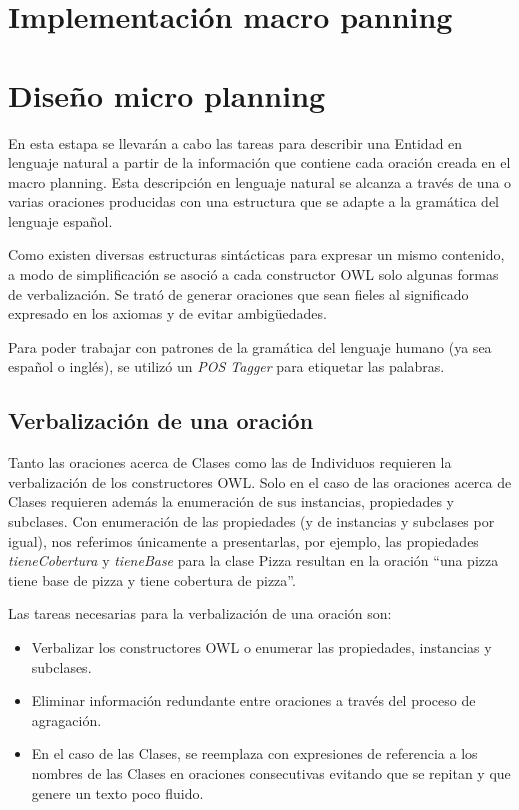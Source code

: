 \section{Implementación macro panning}

\section{Diseño micro planning}
En esta estapa se llevarán a cabo las tareas para describir una Entidad en lenguaje natural a partir de la información que contiene cada oración creada en el macro planning. Esta descripción en lenguaje natural se alcanza a través de una o varias oraciones producidas con una estructura que se adapte a la gramática del lenguaje español.

Como existen diversas estructuras sintácticas para expresar un mismo contenido, a modo de simplificación se asoció a cada constructor OWL solo algunas formas de verbalización. Se trató de generar oraciones que sean fieles al significado expresado en los axiomas y de evitar ambigüedades.

Para poder trabajar con patrones de la gramática del lenguaje humano (ya sea español o inglés), se utilizó un \emph{POS Tagger} para etiquetar las palabras.

\subsection{Verbalización de una oración}
Tanto las oraciones acerca de Clases como las de Individuos requieren la verbalización de los constructores OWL. Solo en el caso de las oraciones acerca de Clases requieren además la enumeración de sus instancias, propiedades y subclases. Con enumeración de las propiedades (y de instancias y subclases por igual), nos referimos únicamente a presentarlas, por ejemplo, las propiedades \emph{tieneCobertura} y \emph{tieneBase} para la clase Pizza resultan en la oración ``una pizza tiene base de pizza y tiene cobertura de pizza''.

Las tareas necesarias para la verbalización de una oración son:
\begin{itemize}
    \item Verbalizar los constructores OWL o enumerar las propiedades, instancias y subclases.
    \item Eliminar información redundante entre oraciones a través del proceso de agragación.
    \item En el caso de las Clases, se reemplaza con expresiones de referencia a los nombres de las Clases en oraciones consecutivas evitando que se repitan y que genere un texto poco fluido.
\end{itemize}

